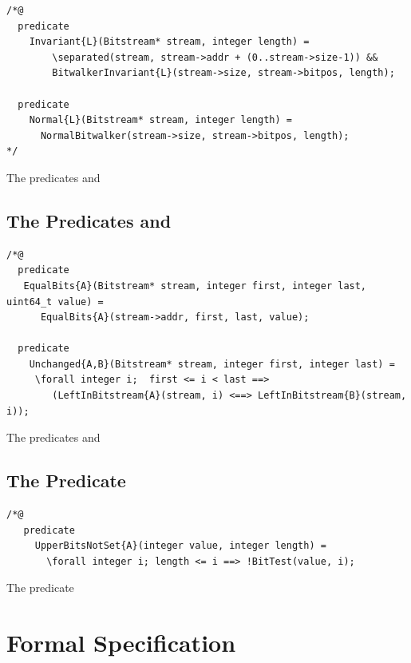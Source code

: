 \begin{listing}[hbt]
\begin{lstlisting}[style=acsl-block]
/*@
  predicate 
    Invariant{L}(Bitstream* stream, integer length) =
        \separated(stream, stream->addr + (0..stream->size-1)) &&
        BitwalkerInvariant{L}(stream->size, stream->bitpos, length);

  predicate
    Normal{L}(Bitstream* stream, integer length) =
      NormalBitwalker(stream->size, stream->bitpos, length);
*/
\end{lstlisting}
\caption{\label{lst:invariant-normal} The predicates \invariant and \normal}
\end{listing}

\clearpage

\subsection{The Predicates \equalbits and \unchanged}

\begin{listing}[hbt]
\begin{lstlisting}[style=acsl-block]
/*@
  predicate
   EqualBits{A}(Bitstream* stream, integer first, integer last, uint64_t value) =
      EqualBits{A}(stream->addr, first, last, value);

  predicate
    Unchanged{A,B}(Bitstream* stream, integer first, integer last) =
     \forall integer i;  first <= i < last ==>
        (LeftInBitstream{A}(stream, i) <==> LeftInBitstream{B}(stream, i));
\end{lstlisting}
\caption{\label{lst:equalbits-unchanged} The predicates \equalbits and \unchanged}
\end{listing}


\subsection{The Predicate \upperbitsnotset}

\begin{listing}[hbt]
\begin{lstlisting}[style=acsl-block]
/*@
   predicate
     UpperBitsNotSet{A}(integer value, integer length) =
       \forall integer i; length <= i ==> !BitTest(value, i);
\end{lstlisting}
\caption{\label{lst:upperbitsnotset} The predicate \upperbitsnotset}
\end{listing}

\section{Formal Specification}
